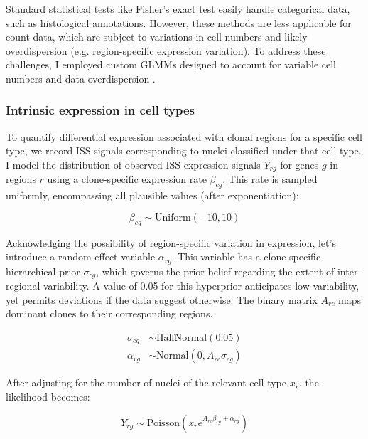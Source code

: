Standard statistical tests like Fisher's exact test easily handle categorical data, such as histological annotations. However, these methods are less applicable for count data, which are subject to variations in cell numbers and likely overdispersion (e.g. region-specific expression variation). To address these challenges, I employed custom \acfp{GLMM} designed to account for variable cell numbers and data overdispersion .

\subsubsection*{Intrinsic expression in cell types}

To quantify differential expression associated with clonal regions for a specific cell type, we record \ac{ISS} signals corresponding to nuclei classified under that cell type. I model the distribution of observed \ac{ISS} expression signals $Y_{rg}$ for genes $g$ in regions $r$ using a clone-specific expression rate $\beta_{cg}$. This rate is sampled uniformly, encompassing all plausible values (after exponentiation):

\begin{equation}
    \beta_{cg} \sim \text{Uniform}(-10,10)
\end{equation}

Acknowledging the possibility of region-specific variation in expression, let's introduce a random effect variable $\alpha_{rg}$. This variable has a clone-specific hierarchical prior $\sigma_{cg}$, which governs the prior belief regarding the extent of inter-regional variability. A value of 0.05 for this hyperprior anticipates low variability, yet permits deviations if the data suggest otherwise. The binary matrix $A_{rc}$ maps dominant clones to their corresponding regions.

\begin{align}
    \sigma_{cg} &\sim \text{HalfNormal}(0.05) \\
    \alpha_{rg} &\sim \text{Normal}(0, A_{rc}\sigma_{cg})
\end{align}

After adjusting for the number of nuclei of the relevant cell type 
$x_r$, the likelihood becomes:

\begin{equation}
    Y_{rg} \sim \text{Poisson}\left(x_r e^{A_{rc}\beta_{cg} + \alpha_{rg}}\right)
\end{equation}
    
